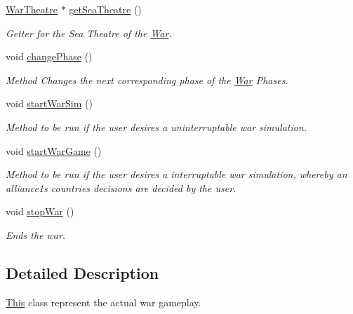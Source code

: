 \begin{DoxyCompactItemize}
\mbox{\hyperlink{class_war_theatre}{War\+Theatre}} $\ast$ \mbox{\hyperlink{class_war_a603fd07ee9a93d2908e12c1d5d06bfa4}{get\+Sea\+Theatre}} ()
\begin{DoxyCompactList}\small\item\em Getter for the Sea Theatre of the \mbox{\hyperlink{class_war}{War}}. \end{DoxyCompactList}\item 
void \mbox{\hyperlink{class_war_a3ecc0e5be41604717bb26d86a2c24571}{change\+Phase}} ()
\begin{DoxyCompactList}\small\item\em Method Changes the next corresponding phase of the \mbox{\hyperlink{class_war}{War}} Phases. \end{DoxyCompactList}\item 
void \mbox{\hyperlink{class_war_ae7095b60438fa57d9238ddd6b895956c}{start\+War\+Sim}} ()
\begin{DoxyCompactList}\small\item\em Method to be run if the user desires a uninterruptable war simulation. \end{DoxyCompactList}\item 
void \mbox{\hyperlink{class_war_adaab1d68249f18f6a6c16e42a43eb403}{start\+War\+Game}} ()
\begin{DoxyCompactList}\small\item\em Method to be run if the user desires a interruptable war simulation, whereby an alliance1\textquotesingle{}s countries decisions are decided by the user. \end{DoxyCompactList}\item 
void \mbox{\hyperlink{class_war_a9bf0fb4d3a5d04c6911799fb5044637c}{stop\+War}} ()
\begin{DoxyCompactList}\small\item\em Ends the war. \end{DoxyCompactList}\end{DoxyCompactItemize}


\subsection{Detailed Description}
\mbox{\hyperlink{class_this}{This}} class represent the actual war gameplay.


